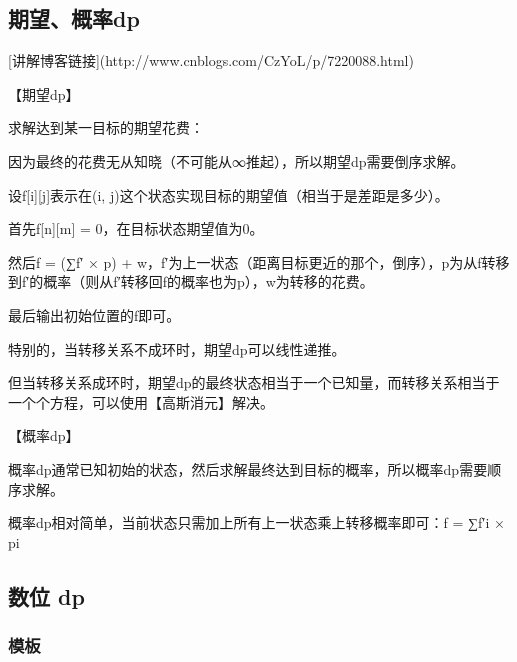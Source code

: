 \subsection{期望、概率dp}

[讲解博客链接](http://www.cnblogs.com/CzYoL/p/7220088.html)

【期望dp】

求解达到某一目标的期望花费：

因为最终的花费无从知晓（不可能从∞推起），所以期望dp需要倒序求解。

设f[i][j]表示在(i, j)这个状态实现目标的期望值（相当于是差距是多少）。

首先f[n][m] = 0，在目标状态期望值为0。

然后f = (∑f′ × p) + w，f′为上一状态（距离目标更近的那个，倒序），p为从f转移到f′的概率（则从f′转移回f的概率也为p），w为转移的花费。

最后输出初始位置的f即可。

特别的，当转移关系不成环时，期望dp可以线性递推。

但当转移关系成环时，期望dp的最终状态相当于一个已知量，而转移关系相当于一个个方程，可以使用【高斯消元】解决。

【概率dp】

概率dp通常已知初始的状态，然后求解最终达到目标的概率，所以概率dp需要顺序求解。

概率dp相对简单，当前状态只需加上所有上一状态乘上转移概率即可：f = ∑f′i × pi

\subsection{数位 dp}

\subsubsection{模板}

